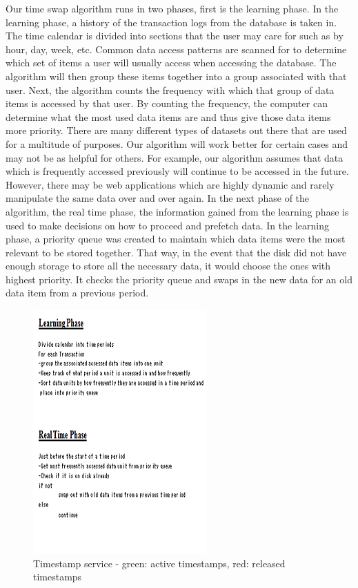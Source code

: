 \documentclass[10pt,final,journal]{IEEEtran}
\begin{document}
  Our time swap algorithm runs in two phases, first is the learning phase. In the learning phase, a history of the transaction logs from the database is taken in. The time calendar is divided into sections that the user may care for such as by hour, day, week, etc. Common data access patterns are scanned for to determine which set of items a user will usually access when accessing the database. The algorithm will then group these items together into a group associated with that user. Next, the algorithm counts the frequency with which that group of data items is accessed by that user. By counting the frequency, the computer can determine what the most used data items are and thus give those data items more priority. There are many different types of datasets out there that are used for a multitude of purposes. Our algorithm will work better for certain cases and may not be as helpful for others. For example, our algorithm assumes that data which is frequently accessed previously will continue to be accessed in the future. However, there may be web applications which are highly dynamic and rarely manipulate the same data over and over again.
	In the next phase of the algorithm, the real time phase, the information gained from the learning phase is used to make decisions on how to proceed and prefetch data. In the learning phase, a priority queue was created to maintain which data items were the most relevant to be stored together. That way, in the event that the disk did not have enough storage to store all the necessary data, it would choose the ones with highest priority. It checks the priority queue and swaps in the new data for an old data item from a previous period.

\begin{figure}[!t]
\centering
\hspace*{-.2in}
\includegraphics{images/timeswapalgo.png}
\caption{Timestamp service - green: active timestamps, red: released timestamps}
\label{ts}
\end{figure}
\end{document}
